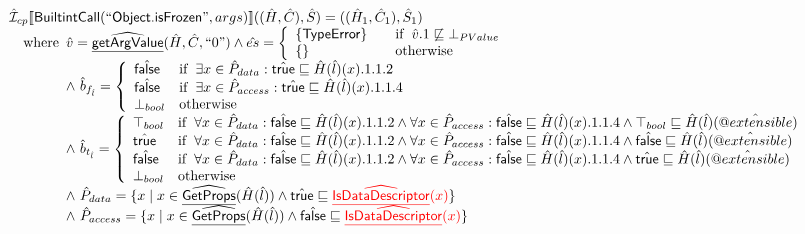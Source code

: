 \documentclass{article}
\makeatletter
\newcommand{\SF}[1]{\mbox{\textsf{#1}}}
\newcommand{\wherec}[1]{{\rm where}\begin{array}[t]{l}#1\end{array}}
\newcommand{\ifc}[1]{{\rm if}\begin{array}[t]{l}#1\end{array}}
\newcommand{\owc}{{\rm otherwise}}
\newcommand{\aI}{\hat{\mathcal{I}}}
\newcommand{\lbr}{\llbracket}
\newcommand{\rbr}{\rrbracket}
\newcommand{\ahf}[1]{\widehat{\underline{\sf #1}}}
\newcommand{\avarprop}[1]{\hat{@#1}}
\newcommand{\atrue}{\hat{\SF{true}}}
\newcommand{\afalse}{\hat{\SF{false}}}
\def\inred{\color{red}}
\def\inred{\color{red}}
\makeatother
\begin{document}
\[\begin{array}{l}
\aI _{cp}\lbr \SF{BuiltintCall}(``\SF{Object.isFrozen}",args)\rbr((\hat{H},\hat{C}), \hat{S})
  = ((\hat{H}_1, \hat{C}_1), \hat{S}_1)\\
\quad\wherec{
 \hat{v} =\ahf{getArgValue}(\hat{H}, \hat{C}, ``0")
  \land \hat{es} =
    \left\{
    \begin{array}{l@{\quad\quad}l}
      \{ \SF{TypeError} \} & \ifc{\hat{v}.1 \not\sqsubseteq \bot_{PValue}}\\
      \{ \}& \owc\\
    \end{array}
    \right.\\
  \land\ \hat{b}_{f_{\hat{l}}} =\left\{\begin{array}{ll}
    \afalse
    & \ifc{ \exists x \in \hat{P}_{data}: \atrue \sqsubseteq \hat{H}(\hat{l})(x).1.1.2}\\
    \afalse
    & \ifc{ \exists x \in \hat{P}_{access}: \atrue \sqsubseteq \hat{H}(\hat{l})(x).1.1.4}\\
    \bot_{bool} & \owc
    \end{array}\right.\\
  \land\ \hat{b}_{t_{\hat{l}}} =\left\{\begin{array}{ll}
    \top_{bool}
    & \ifc{\forall x \in \hat{P}_{data}: \afalse \sqsubseteq \hat{H}(\hat{l})(x).1.1.2 
      \land \forall x \in \hat{P}_{access}: \afalse \sqsubseteq \hat{H}(\hat{l})(x).1.1.4 
      \land \top_{bool} \sqsubseteq \hat{H}(\hat{l})(\avarprop{extensible})}\\
    \atrue
    & \ifc{\forall x \in \hat{P}_{data}: \afalse \sqsubseteq \hat{H}(\hat{l})(x).1.1.2 
      \land \forall x \in \hat{P}_{access}: \afalse \sqsubseteq \hat{H}(\hat{l})(x).1.1.4 
      \land \afalse \sqsubseteq \hat{H}(\hat{l})(\avarprop{extensible})}\\
    \afalse
    & \ifc{\forall x \in \hat{P}_{data}: \afalse \sqsubseteq \hat{H}(\hat{l})(x).1.1.2 
      \land \forall x \in \hat{P}_{access}: \afalse \sqsubseteq \hat{H}(\hat{l})(x).1.1.4 
      \land \atrue \sqsubseteq \hat{H}(\hat{l})(\avarprop{extensible})}\\
    \bot_{bool} & \owc
    \end{array}\right.\\
  \land\ \hat{P}_{data} =
    \{ x \mid x \in \ahf{GetProps}(\hat{H}(\hat{l}))
    \land \atrue \sqsubseteq {\inred \ahf{IsDataDescriptor}(x)}\}\\
  \land\ \hat{P}_{access} =
    \{ x \mid x \in \ahf{GetProps}(\hat{H}(\hat{l}))
    \land \afalse \sqsubseteq {\inred \ahf{IsDataDescriptor}(x)}\}\\  
}
\end{array}\]
\end{document}
